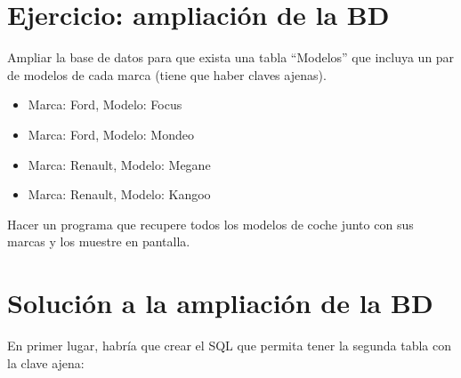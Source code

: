 \documentclass[a4paper,12pt,spanish]{sphinxmanual}
\begin{document}
\section{Ejercicio: ampliación de la BD}
\label{tema2:ejercicio-ampliacion-de-la-bd}
Ampliar la base de datos para que exista una tabla ``Modelos'' que incluya un par de modelos de cada marca (tiene que haber claves ajenas).
\begin{itemize}
\item {} 
Marca: Ford, Modelo: Focus

\item {} 
Marca: Ford, Modelo: Mondeo

\item {} 
Marca: Renault, Modelo: Megane

\item {} 
Marca: Renault, Modelo: Kangoo

\end{itemize}

Hacer un programa que recupere todos los modelos de coche junto con sus marcas y los muestre en pantalla.


\section{Solución a la ampliación de la BD}
\label{tema2:solucion-a-la-ampliacion-de-la-bd}
En primer lugar, habría que crear el SQL que permita tener la segunda tabla con la clave ajena:
\end{document}
